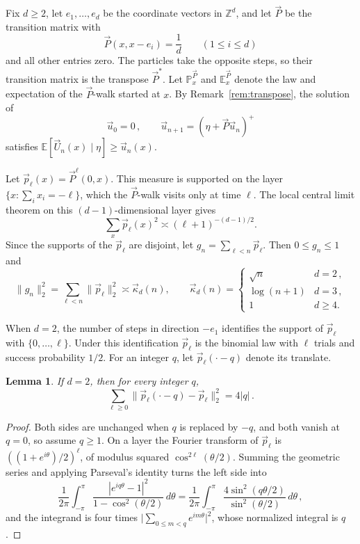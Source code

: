\documentclass[11pt]{amsart}
\theoremstyle{plain}
\newtheorem{lemma}[theorem]{Lemma}
\theoremstyle{definition}
\newcommand{\Z}{\mathbb{Z}}
\newcommand{\E}{\mathbb{E}}
\renewcommand{\P}{\mathbb{P}}
\begin{document}
Fix $d\geq2$, let $e_1,\ldots,e_d$ be the coordinate vectors in $\Z^d$, and
let $\vec P$ be the transition matrix with
\[
	\vec P(x,x-e_i)=\frac1{d}\qquad(1\leq i\leq d)
\]
and all other entries zero. The particles take the opposite steps, so their
transition matrix is the transpose $\vec P^*$. Let $\P_x^{\vec P}$ and
$\E_x^{\vec P}$ denote the law and expectation of the $\vec P$-walk started
at $x$. By Remark~\ref{rem:transpose}, the solution of
\begin{equation}\label{eq:oriented-divisible}
	\vec u_0=0\,,\qquad \vec u_{n+1}=(\eta+\vec P\vec u_n)^+
\end{equation}
satisfies $\E[\vec U_n(x)\mid\eta]\geq \vec u_n(x)$.

Let $\vec p_\ell(x)=\vec P^\ell(0,x)$. This measure is supported on the layer
$\{x:\sum_i x_i=-\ell\}$, which the $\vec P$-walk visits only at time $\ell$.
The local central limit theorem on this $(d-1)$-dimensional layer gives
\begin{equation}\label{eq:oriented-heat}
	\sum_x\vec p_\ell(x)^2\asymp(\ell+1)^{-(d-1)/2}.
\end{equation}
Since the supports of the $\vec p_\ell$ are disjoint, let
$g_n=\sum_{\ell<n}\vec p_\ell$. Then $0\leq g_n\leq1$ and
\begin{equation}\label{eq:oriented-green}
	\|g_n\|_2^2=\sum_{\ell<n}\|\vec p_\ell\|_2^2\asymp \vec\kappa_d(n),
	\qquad
	\vec\kappa_d(n)=
	\begin{cases}
		\sqrt n&d=2\,,\\
		\log(n+1)&d=3\,,\\
		1&d\geq4.
	\end{cases}
\end{equation}

When $d=2$, the number of steps in direction $-e_1$ identifies the support of
$\vec p_\ell$ with $\{0,\ldots,\ell\}$. Under this identification $\vec p_\ell$
is the binomial law with $\ell$ trials and success probability $1/2$. For an
integer $q$, let $\vec p_\ell(\cdot-q)$ denote its translate.

\begin{lemma}\label{lem:shift}
	If $d=2$, then for every integer $q$,
	\[
		\sum_{\ell\geq0}\bigl\|\vec p_\ell(\cdot-q)-\vec p_\ell\bigr\|_2^2=4|q|\,.
	\]
\end{lemma}

\begin{proof}
	Both sides are unchanged when $q$ is replaced by $-q$, and both vanish at
	$q=0$, so assume $q\geq1$.
	On a layer the Fourier transform of $\vec p_\ell$ is
	$((1+e^{i\theta})/2)^\ell$, of modulus squared $\cos^{2\ell}(\theta/2)$.
	Summing the geometric series and applying Parseval's identity turns the left
	side into
	\[
		\frac1{2\pi}\int_{-\pi}^{\pi}\frac{|e^{iq\theta}-1|^2}
		{1-\cos^2(\theta/2)}\,d\theta
		=\frac1{2\pi}\int_{-\pi}^{\pi}
		\frac{4\sin^2(q\theta/2)}{\sin^2(\theta/2)}\,d\theta\,,
	\]
	and the integrand is four times
	$\bigl|\sum_{0\leq m<q}e^{im\theta}\bigr|^2$, whose normalized integral is
	$q$.
\end{proof}
\end{document}
